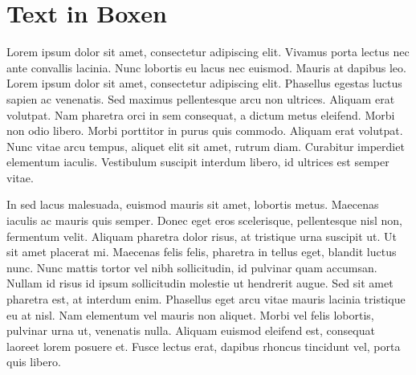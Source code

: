 \documentclass[12pt, a4paper, twopage]{scrartcl}
\begin{document}









\section{Text in Boxen}

\begin{mdframed}[style=exampledefault,frametitle={Braucht package mdframed.}]
Lorem ipsum dolor sit amet, consectetur adipiscing elit. Vivamus porta lectus nec ante convallis lacinia. Nunc lobortis eu lacus nec euismod. Mauris at dapibus leo. Lorem ipsum dolor sit amet, consectetur adipiscing elit. Phasellus egestas luctus sapien ac venenatis. Sed maximus pellentesque arcu non ultrices. Aliquam erat volutpat. Nam pharetra orci in sem consequat, a dictum metus eleifend. Morbi non odio libero. Morbi porttitor in purus quis commodo. Aliquam erat volutpat. Nunc vitae arcu tempus, aliquet elit sit amet, rutrum diam. Curabitur imperdiet elementum iaculis. Vestibulum suscipit interdum libero, id ultrices est semper vitae.
\end{mdframed}


\begin{mdframed}[style=simple,frametitle={Mein style.}]

In sed lacus malesuada, euismod mauris sit amet, lobortis metus. Maecenas iaculis ac mauris quis semper. Donec eget eros scelerisque, pellentesque nisl non, fermentum velit. Aliquam pharetra dolor risus, at tristique urna suscipit ut. Ut sit amet placerat mi. Maecenas felis felis, pharetra in tellus eget, blandit luctus nunc. Nunc mattis tortor vel nibh sollicitudin, id pulvinar quam accumsan. Nullam id risus id ipsum sollicitudin molestie ut hendrerit augue. Sed sit amet pharetra est, at interdum enim. Phasellus eget arcu vitae mauris lacinia tristique eu at nisl. Nam elementum vel mauris non aliquet. Morbi vel felis lobortis, pulvinar urna ut, venenatis nulla. Aliquam euismod eleifend est, consequat laoreet lorem posuere et. Fusce lectus erat, dapibus rhoncus tincidunt vel, porta quis libero. 

\end{mdframed}
\end{document}
